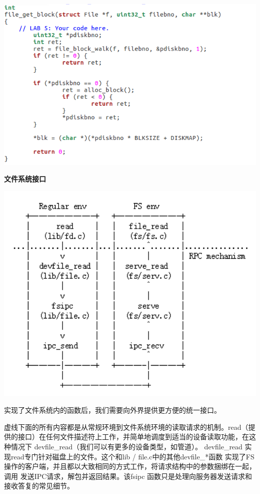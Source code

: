\begin{ExerciseList}
  \includegraphics[width=6in]{figures/lab5/image77.png}

  \textbf{文件系统接口}

  \includegraphics[width=6in]{figures/lab5/image78.png}

  实现了文件系统内的函数后，我们需要向外界提供更方便的统一接口。

  虚线下面的所有内容都是从常规环境到文件系统环境的读取请求的机制。read（提供的接口）在任何文件描述符上工作，并简单地调度到适当的设备读取功能，在这种情况下 devfile\_read（我们可以有更多的设备类型，如管道）。 devfile\_read 实现read专门针对磁盘上的文件。这个和lib / file.c中的其他devfile\_*函数 实现了FS操作的客户端，并且都以大致相同的方式工作，将请求结构中的参数捆绑在一起，调用 发送IPC请求，解包并返回结果。该fsipc 函数只是处理向服务器发送请求和接收答复的常见细节。


\end{ExerciseList}
